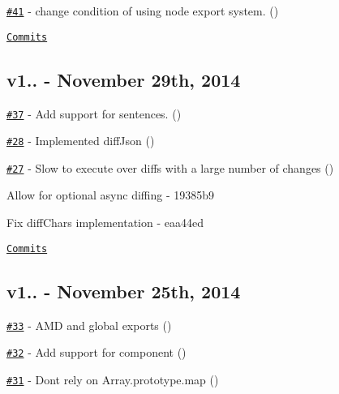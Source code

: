 \begin{DoxyItemize}
\item \href{https://github.com/kpdecker/jsdiff/pull/41}{\tt \#41} -\/ change condition of using node export system. (\href{https://api.github.com/users/ironhee}{\tt })
\end{DoxyItemize}

\href{https://github.com/kpdecker/jsdiff/compare/v1.2.0...v1.2.1}{\tt Commits}

\subsection*{v1.. -\/ November 29th, 2014}


\begin{DoxyItemize}
\item \href{https://github.com/kpdecker/jsdiff/pull/37}{\tt \#37} -\/ Add support for sentences. (\href{https://api.github.com/users/vmariano}{\tt })
\item \href{https://github.com/kpdecker/jsdiff/pull/28}{\tt \#28} -\/ Implemented diff\+Json (\href{https://api.github.com/users/papandreou}{\tt })
\item \href{https://github.com/kpdecker/jsdiff/issues/27}{\tt \#27} -\/ Slow to execute over diffs with a large number of changes (\href{https://api.github.com/users/termi}{\tt })
\item Allow for optional async diffing -\/ 19385b9
\item Fix diff\+Chars implementation -\/ eaa44ed
\end{DoxyItemize}

\href{https://github.com/kpdecker/jsdiff/compare/v1.1.0...v1.2.0}{\tt Commits}

\subsection*{v1.. -\/ November 25th, 2014}


\begin{DoxyItemize}
\item \href{https://github.com/kpdecker/jsdiff/pull/33}{\tt \#33} -\/ A\+MD and global exports (\href{https://api.github.com/users/ovcharik}{\tt })
\item \href{https://github.com/kpdecker/jsdiff/pull/32}{\tt \#32} -\/ Add support for component (\href{https://api.github.com/users/vmariano}{\tt })
\item \href{https://github.com/kpdecker/jsdiff/pull/31}{\tt \#31} -\/ Don\textquotesingle{}t rely on Array.\+prototype.\+map (\href{https://api.github.com/users/papandreou}{\tt })
\end{DoxyItemize}

